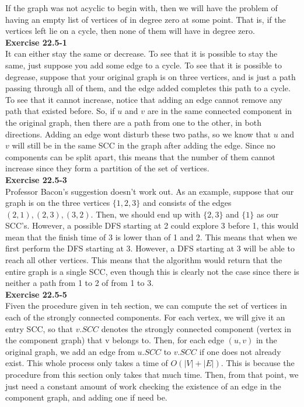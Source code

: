 \documentclass{article}
\begin{document}
If the graph was not acyclic to begin with, then we will have the problem of having an empty list of vertices of in degree zero at some point. That is, if the vertices left lie on a cycle, then none of them will have in degree zero.\\

\noindent\textbf{Exercise 22.5-1}\\
It can either stay the same or decrease. To see that it is possible to stay the same, just suppose you add some edge to a cycle. To see that it is possible to degrease, suppose that your original graph is on three vertices, and is just a path passing through all of them, and the edge added completes this path to a cycle. To see that it cannot increase, notice that adding an edge cannot remove any path that existed before. So, if $u$ and $v$ are in the same connected component in the original graph, then there are a path from one to the other, in both directions. Adding an edge wont disturb these two paths, so we know that $u$ and $v$ will still be in the same SCC in the graph after adding the edge. Since no components can be split apart, this means that the number of them cannot increase since they form a partition of the set of vertices.\\


\noindent\textbf{Exercise 22.5-3}\\
Professor Bacon's suggestion doesn't work out. As an example, suppose that our graph is on the three vertices $\{1,2,3\}$ and consists of the edges $(2,1),(2,3),(3,2)$. Then, we should end up with $\{2,3\}$ and $\{1\}$ as our SCC's. However, a possible DFS starting at 2 could explore 3 before 1, this would mean that the finish time of 3 is lower than of 1 and 2. This means that when we first perform the DFS starting at 3. However, a DFS starting at 3 will be able to reach all other vertices. This means that the algorithm would return that the entire graph is a single SCC, even though this is clearly not the case since there is neither a path from 1 to 2 of from 1 to 3.\\

\noindent\textbf{Exercise 22.5-5}\\
Fiven the procedure given in teh section, we can compute the set of vertices in each of the strongly connected components. For each vertex, we will give it an entry SCC, so that $v.SCC$ denotes the strongly connected component (vertex in the component graph) that v belongs to. Then, for each edge $(u,v)$ in the original graph, we add an edge from $u.SCC$ to $v.SCC$ if one does not already exist. This whole process only takes a time of $O(|V|+|E|)$. This is because the procedure from this section only takes that much time. Then, from that point, we just need a constant amount of work checking the existence of an edge in the component graph, and adding one if need be.\\
\end{document}
